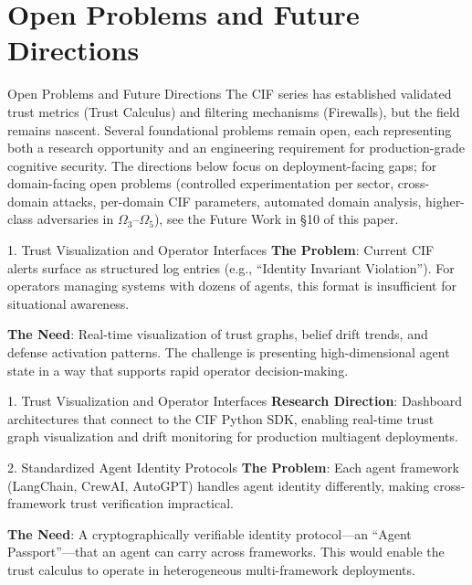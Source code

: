 \documentclass[
  ignorenonframetext,
]{beamer}
\author{\texorpdfstring{}{}}
\date{}
\begin{document}
\begin{frame}
\newpage
\end{frame}

\section{Open Problems and Future Directions}\label{sec:future}

\begin{frame}[allowframebreaks]{Open Problems and Future Directions}
The CIF series has established validated trust metrics (Trust Calculus)
and filtering mechanisms (Firewalls), but the field remains nascent.
Several foundational problems remain open, each representing both a
research opportunity and an engineering requirement for production-grade
cognitive security. The directions below focus on deployment-facing
gaps; for domain-facing open problems (controlled experimentation per
sector, cross-domain attacks, per-domain CIF parameters, automated
domain analysis, higher-class adversaries in
\(\Omega_3\)--\(\Omega_5\)), see the Future Work in §10 of this paper.
\end{frame}

\begin{frame}[allowframebreaks]{1. Trust Visualization and Operator
Interfaces}
\protect{}\label{trust-visualization-and-operator-interfaces}
\textbf{The Problem}: Current CIF alerts surface as structured log
entries (e.g., ``Identity Invariant Violation''). For operators managing
systems with dozens of agents, this format is insufficient for
situational awareness.

\textbf{The Need}: Real-time visualization of trust graphs, belief drift
trends, and defense activation patterns. The challenge is presenting
high-dimensional agent state in a way that supports rapid operator
decision-making.

\end{frame}

\begin{frame}[allowframebreaks]{1. Trust Visualization and Operator
Interfaces}
\textbf{Research Direction}: Dashboard architectures that connect to the
CIF Python SDK, enabling real-time trust graph visualization and drift
monitoring for production multiagent deployments.
\end{frame}

\begin{frame}{2. Standardized Agent Identity
Protocols}
\protect{}\label{standardized-agent-identity-protocols}
\textbf{The Problem}: Each agent framework (LangChain, CrewAI, AutoGPT)
handles agent identity differently, making cross-framework trust
verification impractical.

\textbf{The Need}: A cryptographically verifiable identity protocol---an
``Agent Passport''---that an agent can carry across frameworks. This
would enable the trust calculus to operate in heterogeneous
multi-framework deployments.

\end{frame}
\end{document}
